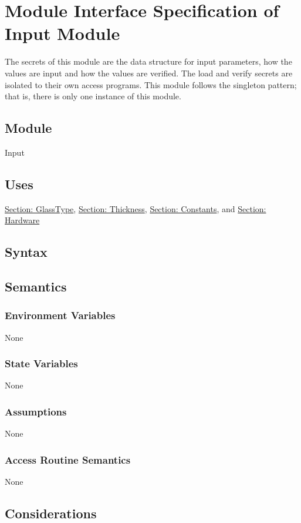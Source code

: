 \documentclass[12pt]{article}
\begin{document}
\section{Module Interface Specification of Input Module}
\label{Sec:Input}
The secrets of this module are the data structure for input parameters, how the values are input and how the values are verified. The load and verify secrets are isolated to their own access programs. This module follows the singleton pattern; that is, there is only one instance of this module.
\subsection{Module}
\label{Sec:Module}
Input
\subsection{Uses}
\label{Sec:Uses}
\hyperref[Sec:GlassTypeADT]{Section: GlassType}, \hyperref[Sec:ThicknessADT]{Section: Thickness}, \hyperref[Sec:ConstantsADT]{Section: Constants}, and \hyperref[Sec:HardwareADT]{Section: Hardware}
\subsection{Syntax}
\label{Sec:Syntax}
\subsection{Semantics}
\label{Sec:Semantics}
\subsubsection{Environment Variables}
\label{Sec:EnviroVars}
None
\subsubsection{State Variables}
\label{Sec:StateVars}
None
\subsubsection{Assumptions}
\label{Sec:Assumps}
None
\subsubsection{Access Routine Semantics}
\label{Sec:AccRoutSemantics}
None
\subsection{Considerations}
\label{Sec:Considerations}
\end{document}
